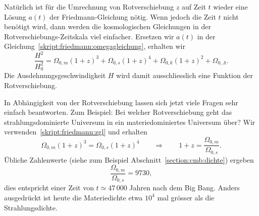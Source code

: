 Natürlich ist für die Umrechnung von Rotverschiebung $z$ auf Zeit $t$
wieder eine Lösung $a(t)$ der Friedmann-Gleichung nötig.
Wenn jedoch die Zeit $t$ nicht benötigt wird, dann werden die
kosmologischen Gleichungen in der Rotverschiebungs-Zeitskala
viel einfacher.
Ersetzen wir $a(t)$ in der Gleichung~\eqref{skript:friedmann:omegagleichung},
erhalten wir
\begin{equation}
\frac{H^2}{H_0^2}
=
\Omega_{0,m}(1+z)^3
+
\Omega_{0,s}(1+z)^4
+
\Omega_{0,k}(1+z)^2
+
\Omega_{0,\Lambda}.
\label{skript:friedmann:zgl}
\end{equation}
Die Ausdehnungsgeschwindigkeit $H$ wird damit ausschliesslich eine
Funktion der Rotverschiebung.

In Abhängigkeit von der Rotverschiebung lassen sich jetzt viele Fragen
sehr einfach beantworten.
Zum Beispiel: Bei welcher Rotverschiebung geht das strahlungsdominierte
Universum in ein materiedominiertes Universum über?
Wir verwenden~\eqref{skript:friedmann:zgl} und erhalten
\[
\Omega_{0,m}(1+z)^3 = \Omega_{0,s}(1+z)^4
\qquad\Rightarrow\qquad
1+z
=
\frac{\Omega_{0,m}}{\Omega_{0,s}}.
\]
Übliche Zahlenwerte (siehe zum Beispiel Abschnitt~\ref{section:cmb:dichte})
ergeben
\begin{equation}
\frac{\Omega_{0,m}}{\Omega_{0,s}} = 9730,
\label{skript:friedmann:msequal}
\end{equation}
dies entspricht einer Zeit von $t\simeq 47\,000$ Jahren nach dem Big Bang.
Anders ausgedrückt ist heute die Materiedichte etwa $10^4$ mal grösser
als die Strahlungsdichte.



